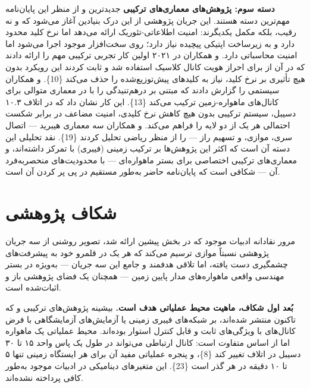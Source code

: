 \documentclass[a4paper,14pt]{extreport}
\begin{document}
\textbf{دسته سوم: پژوهش‌های معماری‌های ترکیبی} جدیدترین و از منظر این پایان‌نامه مهم‌ترین دسته هستند. این جریان پژوهشی از این درک بنیادین آغاز می‌شود که  و  نه رقیب، بلکه مکمل یکدیگرند:  امنیت اطلاعاتی-تئوریک ارائه می‌دهد اما نرخ کلید محدود دارد و به زیرساخت اپتیکی پیچیده نیاز دارد؛  روی سخت‌افزار موجود اجرا می‌شود اما امنیت محاسباتی دارد.  و همکاران در ۲۰۲۱ اولین کار تجربی ترکیبی مهم را ارائه دادند که در آن از  برای احراز هویت کانال کلاسیک  استفاده شد و ثابت کردند این رویکرد بدون هیچ تأثیری بر نرخ کلید، نیاز به کلیدهای پیش‌توزیع‌شده را حذف می‌کند \{10\}.  و همکاران سیستمی را گزارش دادند که  مبتنی بر درهم‌تنیدگی را با  در معماری متوالی  برای کانال‌های ماهواره-زمین ترکیب می‌کند \{13\}. این کار نشان داد که در اتلاف ۱۰.۳ دسیبل، سیستم ترکیبی بدون هیچ کاهش نرخ کلیدی، امنیت مضاعف در برابر شکست احتمالی هر یک از دو لایه را فراهم می‌کند.  و همکاران سه معماری هیبرید  --- اتصال سری، موازی، و تسهیم راز  --- را از منظر ریاضی تحلیل کردند \{19\}. نقد تحلیلی این دسته آن است که اکثر این پژوهش‌ها بر ترکیب  زمینی (فیبری) با  تمرکز داشته‌اند، و معماری‌های ترکیبی اختصاصی برای بستر ماهواره‌ای --- با محدودیت‌های منحصربه‌فرد آن --- شکافی است که پایان‌نامه حاضر به‌طور مستقیم در پی پر کردن آن است.
\section{شکاف پژوهشی}

مرور نقادانه ادبیات موجود که در بخش پیشین ارائه شد، تصویر روشنی از سه جریان پژوهشی نسبتاً موازی ترسیم می‌کند که هر یک در قلمرو خود به پیشرفت‌های چشمگیری دست یافته، اما تلاقی هدفمند و جامع این سه جریان --- به‌ویژه در بستر مهندسی واقعی ماهواره‌های مدار پایین زمین --- همچنان یک فضای پژوهشی باز و اثبات‌شده است.

\textbf{بُعد اول شکاف، ماهیت محیط عملیاتی هدف است.} بیشینه پژوهش‌های ترکیبی  و  که تاکنون منتشر شده‌اند، بر شبکه‌های فیبری زمینی یا آزمایش‌های آزمایشگاهی با فرض کانال‌های با ویژگی‌های ثابت و قابل کنترل استوار بوده‌اند. محیط عملیاتی یک ماهواره  اما از اساس متفاوت است: کانال ارتباطی  می‌تواند در طول یک پاس واحد ۱۵ تا ۳۰ دسیبل در اتلاف تغییر کند \{8\}، و پنجره عملیاتی مفید آن برای هر ایستگاه زمینی تنها ۵ تا ۱۰ دقیقه در هر گذر است \{23\}. این متغیرهای دینامیکی در ادبیات موجود به‌طور کافی پرداخته نشده‌اند.
\end{document}
